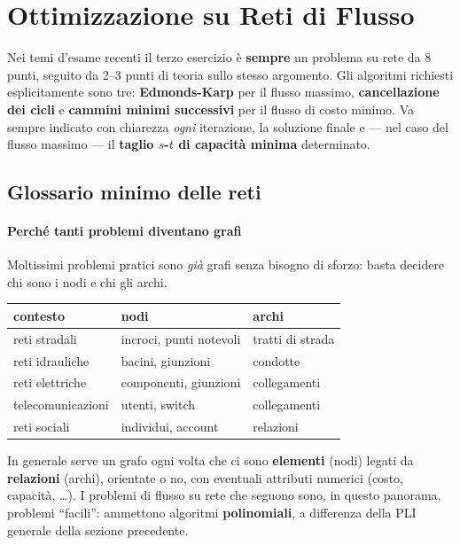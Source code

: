 \documentclass[12pt]{extarticle} %
\begin{document}
\newpage

\section{Ottimizzazione su Reti di Flusso}

\begin{tcolorbox}[colback=red!5, colframe=red!60!black, title=\textbf{Peso d'esame}]
Nei temi d'esame recenti il terzo esercizio è \textbf{sempre} un problema su rete da 8 punti, seguito da 2--3 punti di teoria sullo stesso argomento. Gli algoritmi richiesti esplicitamente sono tre: \textbf{Edmonds-Karp} per il flusso massimo, \textbf{cancellazione dei cicli} e \textbf{cammini minimi successivi} per il flusso di costo minimo. Va sempre indicato con chiarezza \textit{ogni} iterazione, la soluzione finale e --- nel caso del flusso massimo --- il \textbf{taglio $s$-$t$ di capacità minima} determinato.
\end{tcolorbox}

\subsection{Glossario minimo delle reti}
\paragraph{Perché tanti problemi diventano grafi}
Moltissimi problemi pratici sono \emph{già} grafi senza bisogno di sforzo: basta decidere chi sono i nodi e chi gli archi.
\begin{center}
\begin{tabular}{lll}
\hline
\textbf{contesto} & \textbf{nodi} & \textbf{archi} \\
\hline
reti stradali & incroci, punti notevoli & tratti di strada \\
reti idrauliche & bacini, giunzioni & condotte \\
reti elettriche & componenti, giunzioni & collegamenti \\
telecomunicazioni & utenti, switch & collegamenti \\
reti sociali & individui, account & relazioni \\
\hline
\end{tabular}
\end{center}
In generale serve un grafo ogni volta che ci sono \textbf{elementi} (nodi) legati da \textbf{relazioni} (archi), orientate o no, con eventuali attributi numerici (costo, capacità, \dots). I problemi di flusso su rete che seguono sono, in questo panorama, problemi ``facili'': ammettono algoritmi \textbf{polinomiali}, a differenza della PLI generale della sezione precedente.
\end{document}
